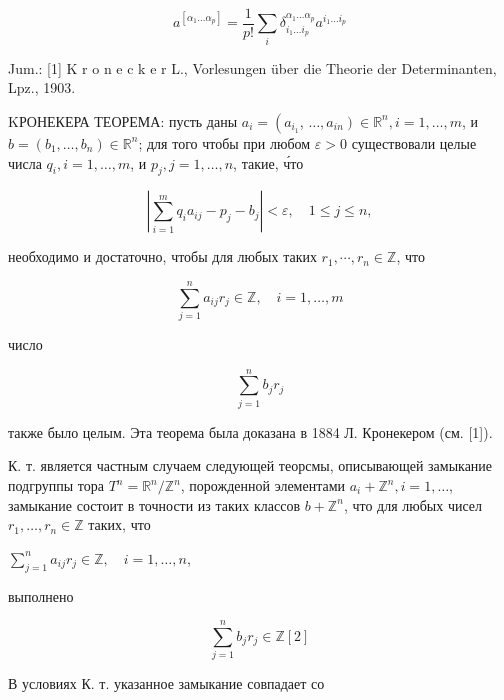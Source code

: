\documentclass[10pt]{article}
\begin{document}
\[

a^{\left[\alpha_{1} \ldots \alpha_{p}\right]}=\frac{1}{p !} \sum_{i} \delta_{i_{1} \ldots i_{p}}^{\alpha_{1} \ldots \alpha_{p}} a^{i_{1} \ldots i_{p}}

\]



Jum.: [1] K r o n e c k e r L., Vorlesungen über die Theorie der Determinanten, Lpz., 1903.



KРОНЕКЕРА ТЕОРЕМА: пусть даны $a_{i}=\left(a_{i_{1}}\right.$, $\left.\ldots, a_{i n}\right) \in \mathbb{R}^{n}, i=1, \ldots, m$, и $b=\left(b_{1}, \ldots, b_{n}\right) \in \mathbb{R}^{n}$; для того чтобы при любом $\varepsilon>0$ существовали целые числа $q_{i}, i=1, \ldots, m$, и $p_{j}, j=1, \ldots, n$, такие, ч́то



\[

\left|\sum_{i=1}^{m} q_{i} a_{i j}-p_{j}-b_{j}\right|<\varepsilon, \quad 1 \leqslant j \leqslant n,

\]



необходимо и достаточно, чтобы для любых таких $r_{1}, \cdots, r_{n} \in \mathbb{Z}$, что



\[

\sum_{j=1}^{n} a_{i j} r_{j} \in \mathbb{Z}, \quad i=1, \ldots, m

\]



число



\[

\sum_{j=1}^{n} b_{j} r_{j}

\]



также было целым. Эта теорема была доказана в 1884 Л. Кронекером (см. [1]).



К. т. является частным случаем следующей теорсмы, описывающей замыкание подгруппы тора $T^{n}=\mathbb{R}^{n} / \mathbb{Z}^{n}$, порожденной элементами $a_{i}+\mathbb{Z}^{n}, i=1, \ldots$, замыкание состоит в точности из таких классов $b+\mathbb{Z}^{n}$, что для любых чисел $r_{1}, \ldots, r_{n} \in \mathbb{Z}$ таких, что



$\sum_{j=1}^{n} a_{i j} r_{j} \in \mathbb{Z}, \quad i=1, \ldots, n$,



выполнено



\[

\sum_{j=1}^{n} b_{j} r_{j} \in \mathbb{Z}[2]

\]



В условиях К. т. указанное замыкание совпадает со
\end{document}
